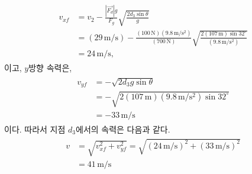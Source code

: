 \documentclass[floatfix,nofootinbib,superscriptaddress,fleqn]{revtex4-2}
\begin{document}
\begin{itemize}
  \begin{align}
    \begin{split}
      v_{x f} &=  v_2 - \frac{|\vec{F_d}|g}{F_g}
      \sqrt{\frac{2d_3\sin{\theta}}{g}} \\
      &= (29\,\mathrm{m/s}) 
      - \frac{(100\,\mathrm{N})(9.8\,\mathrm{m/s^2})}
      {(700\,\mathrm{N})}
      \sqrt{\frac{2(107\,\mathrm{m})\sin{32^\circ}}
      {(9.8\,\mathrm{m/s^2})}}  \\
      &= 24\,\mathrm{m/s},
    \end{split}
  \end{align}
  이고, $y$방향 속력은,
  \begin{align}
    \begin{split}
      v_{y f} &= -\sqrt{2d_3g\sin{\theta}}  \\
      &=-\sqrt{2(107\,\mathrm{m})
      (9.8\,\mathrm{m/s^2})\sin{32^\circ}} \\
      &=-33\,\mathrm{m/s}
    \end{split}
  \end{align}
  이다. 따라서 지점 $d_3$에서의 속력은 다음과 같다.
  \begin{align}
    \begin{split}
      v &= \sqrt{v_{xf}^2+v_{yf}^2} 
      = \sqrt{(24\,\mathrm{m/s})^2+(33\,\mathrm{m/s})^2} \\
      &= 41\,\mathrm{m/s}
    \end{split}
  \end{align}
\end{itemize} 
\end{document}
